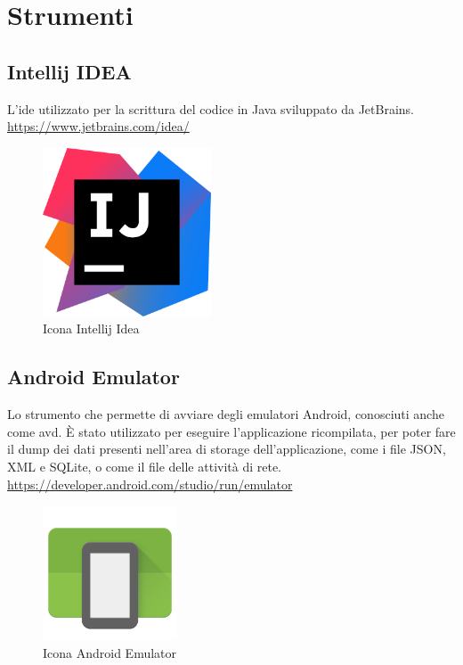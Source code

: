 \section{Strumenti}\label{sec:strumenti}

\subsection*{Intellij IDEA}
L'\gls{ide} utilizzato per la scrittura del codice in Java sviluppato da JetBrains.
\url{https://www.jetbrains.com/idea/}
\begin{figure}[H]
    \centering
    \includegraphics[width=5cm, height=5cm]{./immagini/intellij.png}
    \caption{Icona Intellij Idea}\label{fig:intellij}
\end{figure}

\subsection*{Android Emulator}
Lo strumento che permette di avviare degli emulatori Android, conosciuti anche come \gls{avd}.
È stato utilizzato per eseguire l'applicazione ricompilata, per poter fare il dump dei dati presenti nell'area di storage dell'applicazione, come i file JSON, XML e SQLite, o come il file delle attività di rete.
\url{https://developer.android.com/studio/run/emulator}
\begin{figure}[H]
    \centering
    \includegraphics[width=4cm, height=4cm]{./immagini/emulator.png}
    \caption{Icona Android Emulator}\label{fig:emulator}
\end{figure}

